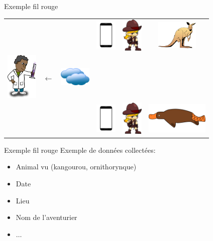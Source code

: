 \documentclass{beamer}
\begin{document}
\begin{frame}{Exemple fil rouge}
\begin{tabular}{lcccrc}
&	& & 
\includegraphics[width=1cm]{phone.png} 
& \includegraphics[width=1cm]{adventurer.png} 
& \includegraphics[width=2cm]{kangourou.png} \\
\includegraphics[width=1.5cm]{researcher.png} & $\leftarrow$
& \includegraphics[width = 1.5cm]{cloud.png}
& & &   \\
& & & 
\includegraphics[width=1cm]{phone.png} 
& \includegraphics[width=1cm]{adventurer.png} 
& \includegraphics[width=3cm]{orni.png}
\end{tabular}
\end{frame}

\begin{frame}{Exemple fil rouge}
Exemple de données collectées:
\begin{itemize}
\item Animal vu (kangourou, ornithorynque)
\item Date
\item Lieu
\item Nom de l'aventurier
\item $\dots$
\end{itemize}
\end{frame}
\end{document}
